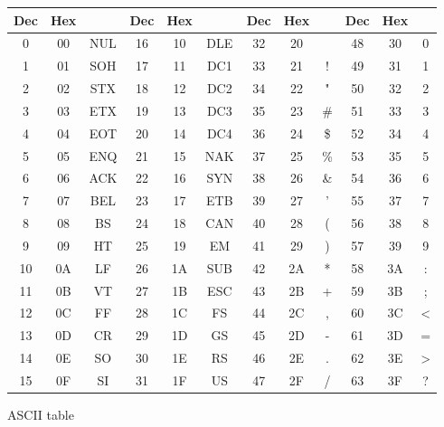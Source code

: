 \documentclass[../index.tex]{subfiles}
\begin{document}
\begin{frame}{\currenttitle}
  \vspace*{1em}
  \scriptsize
  \begin{figure}
    \begin{table}
      \begin{tabular}{|c|c|c||c|c|c||c|c|c||c|c|c|}
        Dec & Hex &    & Dec & Hex &    & Dec & Hex &   & Dec & Hex &  \\ \hline
        0  & 00 & NUL  & 16 & 10 & DLE  & 32 & 20 &     & 48 & 30 & 0  \\
        1  & 01 & SOH  & 17 & 11 & DC1  & 33 & 21 & !   & 49 & 31 & 1  \\
        2  & 02 & STX  & 18 & 12 & DC2  & 34 & 22 & "   & 50 & 32 & 2  \\
        3  & 03 & ETX  & 19 & 13 & DC3  & 35 & 23 & #   & 51 & 33 & 3  \\
        4  & 04 & EOT  & 20 & 14 & DC4  & 36 & 24 & \$  & 52 & 34 & 4  \\
        5  & 05 & ENQ  & 21 & 15 & NAK  & 37 & 25 & \%  & 53 & 35 & 5  \\
        6  & 06 & ACK  & 22 & 16 & SYN  & 38 & 26 & \&  & 54 & 36 & 6  \\
        7  & 07 & BEL  & 23 & 17 & ETB  & 39 & 27 & '   & 55 & 37 & 7  \\
        8  & 08 & BS   & 24 & 18 & CAN  & 40 & 28 & (   & 56 & 38 & 8  \\
        9  & 09 & HT   & 25 & 19 & EM   & 41 & 29 & )   & 57 & 39 & 9  \\
        10 & 0A & LF   & 26 & 1A & SUB  & 42 & 2A & *   & 58 & 3A & :  \\
        11 & 0B & VT   & 27 & 1B & ESC  & 43 & 2B & +   & 59 & 3B & ;  \\
        12 & 0C & FF   & 28 & 1C & FS   & 44 & 2C & ,   & 60 & 3C & <  \\
        13 & 0D & CR   & 29 & 1D & GS   & 45 & 2D & -   & 61 & 3D & =  \\
        14 & 0E & SO   & 30 & 1E & RS   & 46 & 2E & .   & 62 & 3E & >  \\
        15 & 0F & SI   & 31 & 1F & US   & 47 & 2F & /   & 63 & 3F & ?  \\
      \end{tabular}
    \end{table}
    \caption{ASCII table}
  \end{figure}
  \normal
\end{frame}
\end{document}
